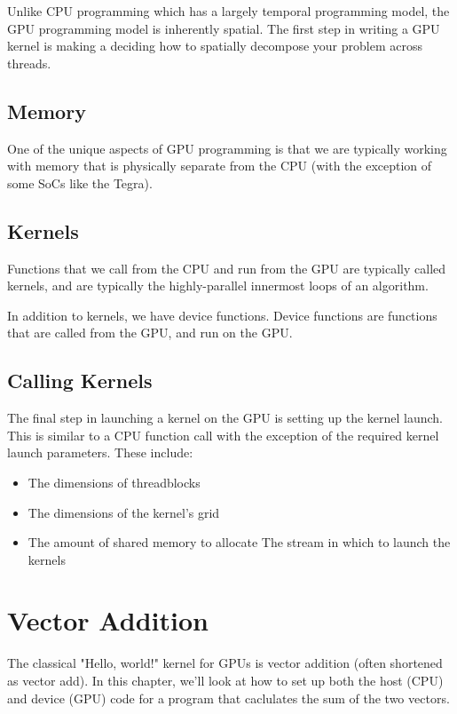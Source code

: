 \documentclass[11pt,fancy,authoryear]{elegantbook}
\begin{document}
Unlike CPU programming which has a largely temporal programming model, the GPU programming model is inherently spatial. The first step in writing a GPU kernel is making a deciding how to spatially decompose your problem across threads.

\section{Memory}

One of the unique aspects of GPU programming is that we are typically working with memory that is physically separate from the CPU (with the exception of some SoCs like the Tegra).

\section{Kernels}

Functions that we call from the CPU and run from the GPU are typically called kernels, and are typically the highly-parallel innermost loops of an algorithm.

In addition to kernels, we have device functions. Device functions are functions that are called from the GPU, and run on the GPU.

\section{Calling Kernels}

The final step in launching a kernel on the GPU is setting up the kernel launch. This is similar to a CPU function call with the exception of the required kernel launch parameters. These include:

\begin{itemize}
  \item The dimensions of threadblocks
  \item The dimensions of the kernel's grid
  \item The amount of shared memory to allocate
  \uten The stream in which to launch the kernels
\end{itemize}

\chapter{Vector Addition}

The classical "Hello, world!" kernel for GPUs is vector addition (often shortened as vector add). In this chapter, we'll look at how to set up both the host (CPU) and device (GPU) code for a program that caclulates the sum of the two vectors.
\end{document}
